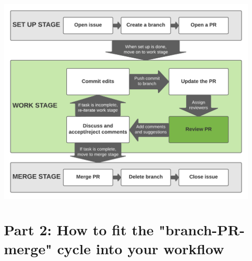 \documentclass[aspectratio=169]{beamer} %
\begin{document}
\begin{frame}
	\includegraphics[width=\textwidth]{./img/branch-pr-merge-cycle-S2-3.png}
\end{frame}



\section{Part 2: \newline How to fit the "branch-PR-merge" cycle into your workflow}





\end{document}
